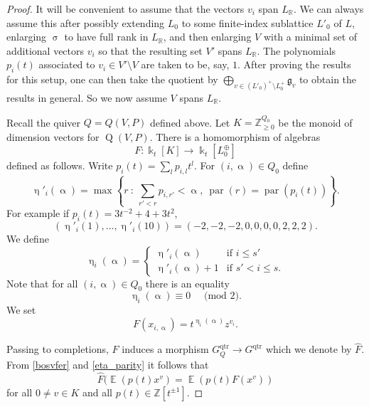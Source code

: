 \documentclass{amsart}
\DeclareMathOperator{\moBQ}{Q}
\newcommand{\BQ}[1]{\moBQ(#1)}
\DeclareMathOperator{\parit}{par}
\DeclareMathOperator{\qtrop}{qtr}
\DeclareMathOperator{\EE}{\mathbb{E}}
\let\bb=\mathbb
\let\f=\mathfrak
\newcommand {\kk} {\Bbbk}
\renewcommand{\alpha}{\upalpha}
\renewcommand{\sigma}{\upsigma}
\renewcommand{\eta}{\upeta}
\theoremstyle{plain}%
\theoremstyle{definition}
\theoremstyle{remark}
\begin{document}
\begin{proof}
It will be convenient to assume that the vectors $v_i$ span $L_{\bb{R}}$.  We can always assume this after possibly extending $L_0$ to some finite-index sublattice $L'_0$ of $L$, enlarging $\sigma$ to have full rank in $L_{\bb{R}}$, and then enlarging $V$ with a minimal set of additional vectors $v_i$ so that the resulting set $V'$ spans $L_{\bb{R}}$.   The polynomials $p_i(t)$ associated to $v_i\in V'\setminus V$ are taken to be, say, $1$.  After proving the results for this setup, one can then take the quotient by $\bigoplus_{v\in (L'_0)^+\setminus L_0^+} \f{g}_v$ to obtain the results in general.  So we now assume $V$ spans $L_{\bb{R}}$.

Recall the quiver $Q=Q(V,P)$ defined above.  
Let $K=\mathbb{Z}_{\geq 0}^{Q_0}$ be the monoid of dimension vectors for $\BQ{V,P}$.  There is a homomorphism of algebras
\[
F\colon \kk_t[K]\rightarrow \kk_t[L_0^{\oplus}]
\]
defined as follows.  Write $p_i(t)=\sum_l p_{i,l}t^l$.  For $(i,\alpha)\in Q_0$ define 
\[
\eta'_i(\alpha)=\max\left\{ r~\colon~ \sum_{r'< r}p_{i,r'} < \alpha,~ \parit(r)= \parit(p_i(t))\right\}.  
\]
For example if $p_i(t)=3t^{-2}+4+3t^2$, 
\[
(\eta'_i(1),\ldots ,\eta'_i(10))=(-2,-2,-2,0,0,0,0,2,2,2).
\]
We define 
\[
\eta_i(\alpha)=\begin{cases} \eta'_i(\alpha) & \textrm{if }i\leq s'\\
\eta'_i(\alpha)+1 &\textrm{if }s'<i\leq s.
\end{cases}
\]
Note that for all $(i,\alpha)\in Q_0$ there is an equality 
\begin{equation}\label{eta_parity}
    \eta_i(\alpha)\equiv 0 \quad\textrm{ (mod $2$).} 
\end{equation}
We set 
\begin{equation*}
F(x_{i,\alpha})=t^{\eta_i(\alpha)}z^{v_i}.
\end{equation*}

Passing to completions, $F$ induces a morphism $G^{\qtrop}_Q\rightarrow G^{\qtrop}$ which we denote by $\hat{F}$.  From \eqref{bosvfer} and \eqref{eta_parity} it follows that
\[
\hat{F}(\EE(p(t)x^v)=\EE(p(t)F(x^v))
\]
for all $0\neq v\in K$ and all $p(t)\in\mathbb{Z}[t^{\pm 1}]$.





\end{proof}
\end{document}
